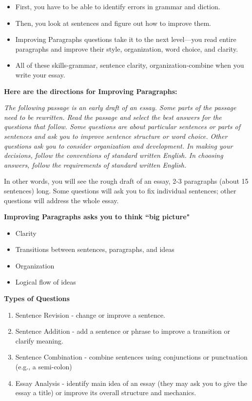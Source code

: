 \begin{itemize}
\item{First, you have to be able to identify errors in grammar and diction. }
\item{Then, you look at sentences and figure out how to improve them.}  
\item{Improving Paragraphs questions take it to the next level—you read entire paragraphs and improve their style, organization, word choice, and clarity.}
\item{All of these skills-grammar, sentence clarity, organization-combine when you write your essay. }
\end{itemize}

\textbf{Here are the directions for Improving Paragraphs:}
\begin{center}
\textit{The following passage is an early draft of an essay. Some parts of the passage need to be rewritten.
Read the passage and select the best answers for the questions that follow. Some questions are about particular sentences or parts of sentences and ask you to improve sentence structure or word choice. Other questions ask you to consider organization and development. In making your decisions, follow the conventions of standard written English. In choosing answers, follow the requirements of standard written English.}
\end{center}

\bigskip
In other words, you will see the rough draft of an essay, 2-3 paragraphs (about 15 sentences) long.  Some questions will ask you to fix individual sentences; other questions will address the whole essay.


\bigskip   %

\bigskip
\textbf{Improving Paragraphs asks you to think ``big picture"}
\begin{itemize}
\item{Clarity}
\item{Transitions between sentences, paragraphs, and ideas}
\item{Organization}
\item{Logical flow of ideas}
\end{itemize}

\bigskip

\bigskip
\textbf{Types of Questions}
\begin{enumerate}
\item{Sentence Revision - change or improve a sentence.}
\item{Sentence Addition - add a sentence or phrase to improve a transition or clarify meaning.}
\item{Sentence Combination - combine sentences using conjunctions or punctuation (e.g., a semi-colon)}
\item{Essay Analysis - identify main idea of an essay (they may ask you to give the essay a title) or improve its overall structure and mechanics.}
\end{enumerate}

